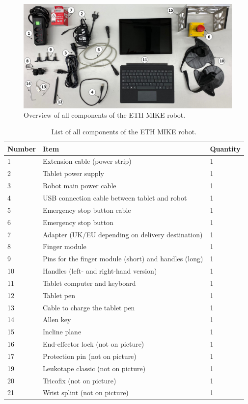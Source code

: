 \documentclass[10pt,oneside,a4paper]{article}
\begin{document}
\begin{figure}[h!]
\begin{center}
\includegraphics[width=\columnwidth]{images/Hardware/parts_annotated.png}
\caption{Overview of all components of the ETH MIKE robot.}
\label{fig:parts}
\end{center}
\end{figure}

\begin{table}[h!]
\centering
\begin{tabular}{lll}
Number & Item & Quantity\\
\hline
1 & Extension cable (power strip) & 1 \\
2 & Tablet power supply & 1 \\
3 & Robot main power cable & 1 \\
4 & USB connection cable between tablet and robot & 1 \\
5 & Emergency stop button cable & 1 \\
6 & Emergency stop button & 1 \\
7 & Adapter (UK/EU depending on delivery destination) & 1 \\
8 & Finger module & 1 \\
9 & Pins for the finger module (short) and handles (long) & 1 \\
10 & Handles (left- and right-hand version) & 1 \\
11 & Tablet computer and keyboard & 1 \\
12 & Tablet pen & 1 \\
13 & Cable to charge the tablet pen & 1 \\
14 & Allen key & 1 \\
15 & Incline plane & 1 \\
16 & End-effector lock (not on picture) & 1 \\
17 & Protection pin (not on picture) & 1 \\
19 & Leukotape classic (not on picture) & 1 \\
20 & Tricofix (not on picture) & 1 \\
21 & Wrist splint (not on picture) & 1 \\
\end{tabular}
\caption{List of all components of the ETH MIKE robot.}
\label{tab:parts}
\end{table}
\end{document}
